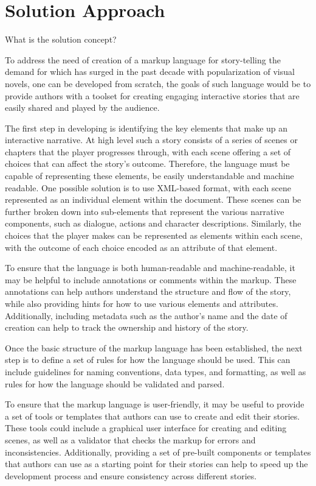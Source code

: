 \section*{Solution Approach} 
\noindent What is the solution concept?

To address the need of creation of a markup language for story-telling the demand for which has surged in the past decade with popularization of visual novels, one can be developed from scratch, the goals of such language would be to provide authors with a toolset for creating engaging interactive stories that are easily shared and played by the audience.

The first step in developing is identifying the key elements that make up an interactive narrative. At high level such a story consists of a series of scenes or chapters that the player progresses through, with each scene offering a set of choices that can affect the story’s outcome. Therefore, the language must be capable of representing these elements, be easily understandable and machine readable.
One possible solution is to use XML-based format, with each scene represented as an individual element within the document. These scenes can be further broken down into sub-elements that represent the various narrative components, such as dialogue, actions and character descriptions. Similarly, the choices that the player makes can be represented as elements within each scene, with the outcome of each choice encoded as an attribute of that element.

To ensure that the language is both human-readable and machine-readable, it may be helpful to include annotations or comments within the markup. These annotations can help authors understand the structure and flow of the story, while also providing hints for how to use various elements and attributes. Additionally, including metadata such as the author's name and the date of creation can help to track the ownership and history of the story.

Once the basic structure of the markup language has been established, the next step is to define a set of rules for how the language should be used. This can include guidelines for naming conventions, data types, and formatting, as well as rules for how the language should be validated and parsed.

To ensure that the markup language is user-friendly, it may be useful to provide a set of tools or templates that authors can use to create and edit their stories. These tools could include a graphical user interface for creating and editing scenes, as well as a validator that checks the markup for errors and inconsistencies. Additionally, providing a set of pre-built components or templates that authors can use as a starting point for their stories can help to speed up the development process and ensure consistency across different stories.

